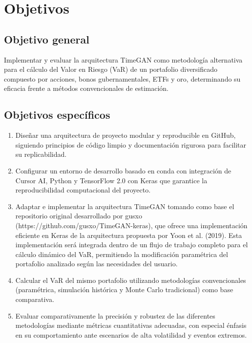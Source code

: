 \documentclass{article}
\theoremstyle{definition}
\theoremstyle{remark}
\begin{document}
\section{Objetivos}

\subsection{Objetivo general}
Implementar y evaluar la arquitectura TimeGAN como metodología alternativa para el cálculo del Valor en Riesgo (VaR) de un portafolio diversificado compuesto por acciones, bonos gubernamentales, ETFs y oro, determinando su eficacia frente a métodos convencionales de estimación.

\subsection{Objetivos específicos}
\begin{enumerate}
    \item Diseñar una arquitectura de proyecto modular y reproducible en GitHub, siguiendo principios de código limpio y documentación rigurosa para facilitar su replicabilidad.
    
    \item Configurar un entorno de desarrollo basado en conda con integración de Cursor AI, Python y TensorFlow 2.0 con Keras que garantice la reproducibilidad computacional del proyecto.
    
    \item Adaptar e implementar la arquitectura TimeGAN tomando como base el repositorio original desarrollado por gusxo (https://github.com/gusxo/TimeGAN-keras), que ofrece una implementación eficiente en Keras de la arquitectura propuesta por Yoon et al. (2019). Esta implementación será integrada dentro de un flujo de trabajo completo para el cálculo dinámico del VaR, permitiendo la modificación paramétrica del portafolio analizado según las necesidades del usuario.
    
    \item Calcular el VaR del mismo portafolio utilizando metodologías convencionales (paramétrica, simulación histórica y Monte Carlo tradicional) como base comparativa.
    
    \item Evaluar comparativamente la precisión y robustez de las diferentes metodologías mediante métricas cuantitativas adecuadas, con especial énfasis en su comportamiento ante escenarios de alta volatilidad y eventos extremos.
\end{enumerate}
\end{document}
